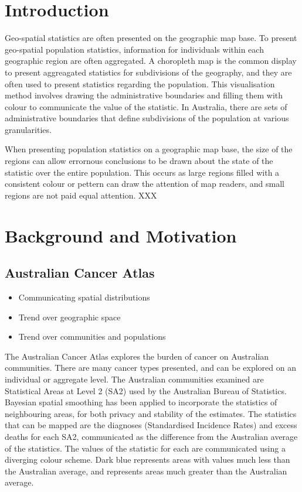 \documentclass[conference,final,]{IEEEtran}
\providecommand{\tightlist}{%
  \setlength{\itemsep}{0pt}\setlength{\parskip}{0pt}}
\begin{document}
\hypertarget{introduction}{%
\section{Introduction}\label{introduction}}

Geo-spatial statistics are often presented on the geographic map base.
To present geo-spatial population statistics, information for
individuals within each geographic region are often aggregated. A
choropleth map is the common display to present aggreagated statistics
for subdivisions of the geography, and they are often used to present
statistics regarding the population. This visualisation method involves
drawing the administrative boundaries and filling them with colour to
communicate the value of the statistic. In Australia, there are sets of
administrative boundaries that define subdivisions of the population at
various granularities.

When presenting population statistics on a geographic map base, the size
of the regions can allow errornous conclusions to be drawn about the
state of the statistic over the entire population. This occurs as large
regions filled with a consistent colour or pettern can draw the
attention of map readers, and small regions are not paid equal
attention. XXX

\hypertarget{background-and-motivation}{%
\section{Background and Motivation}\label{background-and-motivation}}

\hypertarget{australian-cancer-atlas}{%
\subsection{Australian Cancer Atlas}\label{australian-cancer-atlas}}

\begin{itemize}
\tightlist
\item
  Communicating spatial distributions
\item
  Trend over geographic space
\item
  Trend over communities and populations
\end{itemize}

The Australian Cancer Atlas explores the burden of cancer on Australian
communities. There are many cancer types presented, and can be explored
on an individual or aggregate level. The Australian communities examined
are Statistical Areas at Level 2 (SA2) used by the Australian Bureau of
Statistics. Bayesian spatial smoothing has been applied to incorporate
the statistics of neighbouring areas, for both privacy and stability of
the estimates. The statistics that can be mapped are the diagnoses
(Standardised Incidence Rates) and excess deaths for each SA2,
communicated as the difference from the Australian average of the
statistics. The values of the statistic for each are communicated using
a diverging colour scheme. Dark blue represents areas with values much
less than the Australian average, and represents areas much greater than
the Australian average.
\end{document}
